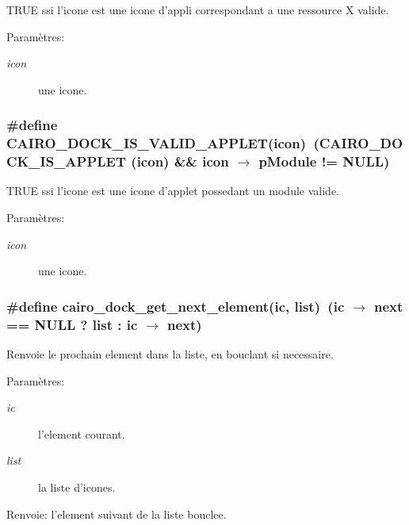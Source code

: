 TRUE ssi l'icone est une icone d'appli correspondant a une ressource X valide. \begin{Desc}
\item[Paramètres:]
\begin{description}
\item[{\em icon}]une icone. \end{description}
\end{Desc}
\subsubsection{\setlength{\rightskip}{0pt plus 5cm}\#define CAIRO\_\-DOCK\_\-IS\_\-VALID\_\-APPLET(icon)~(CAIRO\_\-DOCK\_\-IS\_\-APPLET (icon) \&\& icon $\rightarrow$ pModule != NULL)}\label{cairo-dock-icons_8h_adc6330516b0f2af898a02700a9e8ad1}


TRUE ssi l'icone est une icone d'applet possedant un module valide. \begin{Desc}
\item[Paramètres:]
\begin{description}
\item[{\em icon}]une icone. \end{description}
\end{Desc}
\subsubsection{\setlength{\rightskip}{0pt plus 5cm}\#define cairo\_\-dock\_\-get\_\-next\_\-element(ic, list)~(ic $\rightarrow$ next == NULL ? list : ic $\rightarrow$ next)}\label{cairo-dock-icons_8h_7ccbc1fbff09a250d0c35632113a9aa3}


Renvoie le prochain element dans la liste, en bouclant si necessaire. \begin{Desc}
\item[Paramètres:]
\begin{description}
\item[{\em ic}]l'element courant. \item[{\em list}]la liste d'icones. \end{description}
\end{Desc}
\begin{Desc}
\item[Renvoie:]l'element suivant de la liste bouclee. \end{Desc}
